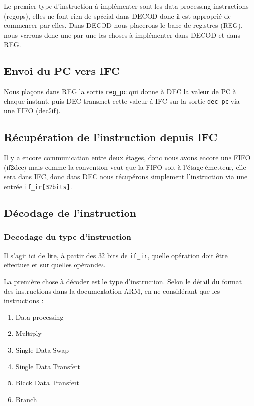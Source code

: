 \documentclass{article}
\begin{document}
Le premier type d'instruction à implémenter sont les data processing instructions (regops),
elles ne font rien de spécial
dans DECOD donc il est approprié de commencer par elles.
Dans DECOD nous placerons le banc de registres (REG), nous verrons donc une par une les choses
à implémenter dans DECOD et dans REG.

\subsection{Envoi du PC vers IFC}

Nous plaçons dans REG la sortie \texttt{reg\_pc} qui donne à DEC la valeur de PC à chaque instant,
puis DEC transmet cette valeur à IFC sur la sortie \texttt{dec\_pc} via une FIFO (dec2if).

\subsection{Récupération de l'instruction depuis IFC}

Il y a encore communication entre deux étages, donc nous avons encore une FIFO (if2dec)
mais comme la convention veut que la FIFO soit à l'étage émetteur, elle sera dans IFC,
donc dans DEC nous récupérons simplement l'instruction via une entrée \texttt{if\_ir[32bits]}.

\subsection{Décodage de l'instruction}

\subsubsection{Decodage du type d'instruction}

Il s'agit ici de lire, à partir des 32 bits de \texttt{if\_ir}, quelle opération
doit être effectuée et sur quelles opérandes.

La première chose à décoder est le type d'instruction. Selon le détail du format des
instructions dans la documentation ARM, en ne considérant que les instructions :
\begin{enumerate}
  \item Data processing
  \item Multiply
  \item Single Data Swap
  \item Single Data Transfert
  \item Block Data Transfert
  \item Branch
\end{enumerate}
\end{document}
